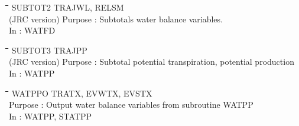 \documentclass[11pt]{article}
\begin{document}
\nwln
\begin{tabbing}
\hspace{1.27cm}\=\hspace{1.27cm}\=\hspace{1.27cm}\=\hspace{1.27cm}\=%
\hspace{1.27cm}\=\hspace{1.27cm}\=\hspace{1.27cm}\=\hspace{1.27cm}\=%
\hspace{1.27cm}\=\hspace{1.27cm}\=\kill
SUBTOT2\> \> TRAJWL, RELSM\\
(JRC version)\> \> Purpose\> : Subtotals water balance variables.\\
\>\> In\> : WATFD
\end{tabbing}

\nwln
\begin{tabbing}
\hspace{1.27cm}\=\hspace{1.27cm}\=\hspace{1.27cm}\=\hspace{1.27cm}\=%
\hspace{1.27cm}\=\hspace{1.27cm}\=\hspace{1.27cm}\=\hspace{1.27cm}\=%
\hspace{1.27cm}\=\hspace{1.27cm}\=\kill
SUBTOT3\> \> TRAJPP\\
(JRC version)\> \> Purpose\> : Subtotal potential transpiration, potential production\\
\>\> In\> : WATPP
\end{tabbing}

\nwln
\begin{tabbing}
\hspace{1.27cm}\=\hspace{1.27cm}\=\hspace{1.27cm}\=\hspace{1.27cm}\=%
\hspace{1.27cm}\=\hspace{1.27cm}\=\hspace{1.27cm}\=\hspace{1.27cm}\=%
\hspace{1.27cm}\=\hspace{1.27cm}\=\kill
WATPPO\> \> TRATX, EVWTX, EVSTX\\
\>\> Purpose\> : Output water balance variables from subroutine WATPP\\
\>\> In\> : WATPP, STATPP
\end{tabbing}
\end{document}

